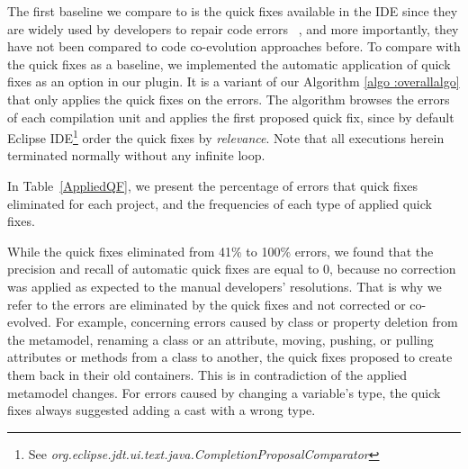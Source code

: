 	The first baseline we compare to is the quick fixes available in the IDE since they are widely used by developers to repair code errors%
	~\cite{10.1145/2384616.2384665}, and more importantly, they have not been compared to code co-evolution approaches before. 
	To compare with the quick fixes as a baseline, we implemented the automatic application of quick fixes as an option in our plugin. It is a variant of our Algorithm \ref{algo :overallalgo} that only applies the quick fixes on the errors. 
	The algorithm browses the errors of each compilation unit and applies the first proposed quick fix, since by default Eclipse IDE\footnote{See \emph{org.eclipse.jdt.ui.text.java.CompletionProposalComparator}} order the quick fixes by \emph{relevance}. Note that all executions herein terminated normally without any infinite loop.
	
	
	
	
	In Table~\ref{AppliedQF}, we present the percentage of errors that quick fixes eliminated for each project, and the frequencies of each type of applied quick fixes. 
	
	While the quick fixes eliminated from 41\% to 100\% errors, we found that the precision and recall of automatic quick fixes are equal to 0, because no correction was applied as expected to the manual developers' resolutions. That is why we refer to the errors are eliminated by the quick fixes and not corrected or co-evolved. 
	For example, concerning errors caused by class or property deletion from the metamodel, renaming a class or an attribute, moving, pushing, or pulling attributes or methods from a class to another, the quick fixes proposed to create them back in their old containers. This is in contradiction of the applied metamodel changes.  
	For errors caused by changing a variable's type, the quick fixes always suggested adding a cast with a wrong type. 
	
